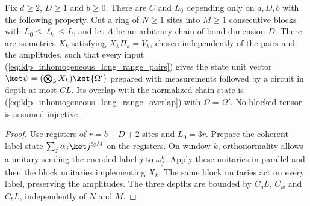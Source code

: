 \begin{lemma}
    \label{lem:ldp_inhomogeneous_long_range_preparation}
    \leanok
    Fix $d\ge2$, $D\ge1$ and $b\ge0$. There are $C$ and $L_0$ depending
    only on $d,D,b$ with the following property. Cut a ring of $N\ge1$ sites
    into $M\ge1$ consecutive blocks with $L_0\le\ell_k\le L$, and let $A$
    be an arbitrary chain of bond dimension $D$. There are isometries $X_k$
    satisfying $X_k\Pi_k=V_k$, chosen independently of the pairs and the
    amplitudes, such that every input
    (\ref{eq:ldp_inhomogeneous_long_range_pairs}) gives the state
    unit vector $\ket\psi=(\bigotimes_kX_k)\ket{\Omega'}$ prepared with measurements
    followed by a circuit in depth at most $CL$. Its overlap with the
    normalized chain state is
    (\ref{eq:ldp_inhomogeneous_long_range_overlap}) with $\Omega=\Omega'$.
    No blocked tensor is assumed injective.
\end{lemma}
\begin{proof}
    \leanok
    Use registers of $r=b+D+2$ sites and $L_0=3r$. Prepare the coherent label
    state $\sum_j\alpha_j\ket j^{\otimes M}$ on the registers. On window $k$,
    orthonormality allows a unitary sending the encoded label $j$ to
    $\omega_j^k$. Apply these unitaries in parallel and then the block
    unitaries implementing $X_k$. The same block unitaries act on every
    label, preserving the amplitudes. The three depths are bounded by
    $C_gL$, $C_w$ and $C_bL$, independently of $N$ and $M$.
\end{proof}
